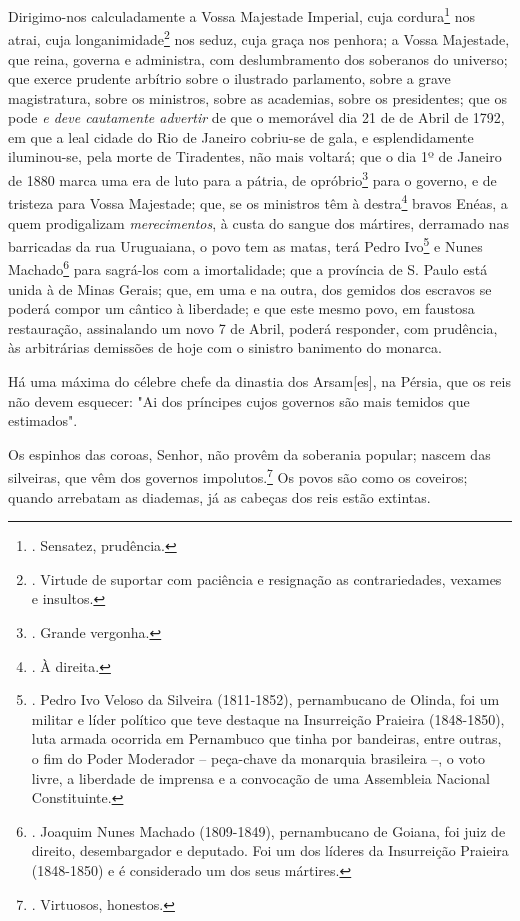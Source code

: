 Dirigimo-nos calculadamente a Vossa Majestade Imperial, cuja
cordura\footnote{. Sensatez, prudência.} nos atrai, cuja
longanimidade\footnote{. Virtude de suportar com paciência e resignação
  as contrariedades, vexames e insultos.} nos seduz, cuja graça nos
penhora; a Vossa Majestade, que reina, governa e administra, com
deslumbramento dos soberanos do universo; que exerce prudente arbítrio
sobre o ilustrado parlamento, sobre a grave magistratura, sobre os
ministros, sobre as academias, sobre os presidentes; que os pode \emph{e
deve cautamente advertir} de que o memorável dia 21 de de Abril de 1792,
em que a leal cidade do Rio de Janeiro cobriu-se de gala, e
esplendidamente iluminou-se, pela morte de Tiradentes, não mais voltará;
que o dia 1º de Janeiro de 1880 marca uma era de luto para a pátria, de
opróbrio\footnote{. Grande vergonha.} para o governo, e de tristeza para
Vossa Majestade; que, se os ministros têm à destra\footnote{. À direita.}
bravos Enéas, a quem prodigalizam \emph{merecimentos}, à custa do sangue
dos mártires, derramado nas barricadas da rua Uruguaiana, o povo tem as
matas, terá Pedro Ivo\footnote{. Pedro Ivo Veloso da Silveira
  (1811-1852), pernambucano de Olinda, foi um militar e líder político
  que teve destaque na Insurreição Praieira (1848-1850), luta armada
  ocorrida em Pernambuco que tinha por bandeiras, entre outras, o fim do
  Poder Moderador -- peça-chave da monarquia brasileira --, o voto
  livre, a liberdade de imprensa e a convocação de uma Assembleia
  Nacional Constituinte.} e Nunes Machado\footnote{. Joaquim Nunes
  Machado (1809-1849), pernambucano de Goiana, foi juiz de direito,
  desembargador e deputado. Foi um dos líderes da Insurreição Praieira
  (1848-1850) e é considerado um dos seus mártires.} para sagrá-los com
a imortalidade; que a província de S. Paulo está unida à de Minas
Gerais; que, em uma e na outra, dos gemidos dos escravos se poderá
compor um cântico à liberdade; e que este mesmo povo, em faustosa
restauração, assinalando um novo 7 de Abril, poderá responder, com
prudência, às arbitrárias demissões de hoje com o sinistro banimento do
monarca.

Há uma máxima do célebre chefe da dinastia dos Arsam{[}es{]}, na Pérsia,
que os reis não devem esquecer: "Ai dos príncipes cujos governos são
mais temidos que estimados".

Os espinhos das coroas, Senhor, não provêm da soberania popular; nascem
das silveiras, que vêm dos governos impolutos.\footnote{. Virtuosos,
  honestos.} Os povos são como os coveiros; quando arrebatam as
diademas, já as cabeças dos reis estão extintas.

